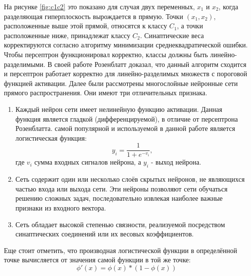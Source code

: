 \documentclass[oneside,final,14pt]{extreport}
\begin{document}
На рисунке \ref{fig:c1c2} это показано для случая двух переменных, \(x_1\) и \(x_2\), когда разделяющая гиперплоскость вырождается в прямую. Точки \((x_1,x_2)\), расположенные выше этой прямой, относятся к классу \(C_1\), а точки расположенные ниже, принадлежат классу \(C_2\). Синаптические веса корректируются согласно алгоритму минимизации среднеквадратической ошибки. Чтобы персептрон функционировал корректно, классы должны быть линейно-разделимыми.
В своей работе Розенблатт доказал, что данный алгоритм сходится и персептрон работает корректно для линейно-разделимых множеств с пороговой функцией активации. 
Далее были рассмотрены многослойные нейронные сети прямого распространения. Они имеют три отличительных признака.
\begin{enumerate}
    \item Каждый нейрон сети имеет нелинейную функцию активации. Данная функция является гладкой (дифференцируемой), в отличие от персептрона Розенблатта. самой популярной и используемой в данной работе является логистическая функция:
    \[y_i = \frac{1}{1+e^{-v_i}},\]
    где \(v_i\) сумма входных сигналов нейрона, а \(y_i\) - выход нейрона.
    \item Сеть содержит один или несколько слоёв скрытых нейронов, не являющихся частью входа или выхода сети. Эти нейроны позволяют сети обучаться решению сложных задач, последовательно извлекая наиболее важные признаки из входного вектора.
    \item Сеть обладает высокой степенью связности, реализуемой посредством синаптических соединений или их весовых коэффициентов.
\end{enumerate}
Еще стоит отметить, что производная логистической функции в определённой точке вычисляется от значения самой функции в той же точке:
\[ \phi'(x) = \phi(x)*(1-\phi(x)) \]
\end{document}
